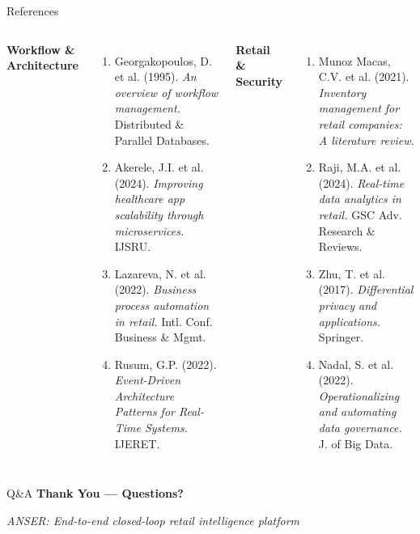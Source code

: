 \documentclass[10pt]{beamer}
\begin{document}
\begin{frame}{References}
\begin{columns}[T]
        \textbf{Workflow \& Architecture}
        \begin{enumerate}
            \item[{[3]}] Georgakopoulos, D. et al. (1995). \textit{An overview of workflow management.} Distributed \& Parallel Databases.
            \item[{[7]}] Akerele, J.I. et al. (2024). \textit{Improving healthcare app scalability through microservices.} IJSRU.
            \item[{[15]}] Lazareva, N. et al. (2022). \textit{Business process automation in retail.} Intl. Conf. Business \& Mgmt.
            \item[{[19]}] Rusum, G.P. (2022). \textit{Event-Driven Architecture Patterns for Real-Time Systems.} IJERET.
        \end{enumerate}
        \vspace{0.15cm}
        \textbf{Retail \& Security}
        \begin{enumerate}
            \item[{[1]}] Munoz Macas, C.V. et al. (2021). \textit{Inventory management for retail companies: A literature review.}
            \item[{[25]}] Raji, M.A. et al. (2024). \textit{Real-time data analytics in retail.} GSC Adv. Research \& Reviews.
            \item[{[31]}] Zhu, T. et al. (2017). \textit{Differential privacy and applications.} Springer.
            \item[{[29]}] Nadal, S. et al. (2022). \textit{Operationalizing and automating data governance.} J. of Big Data.
        \end{enumerate}
    \end{columns}
\end{frame}

\begin{frame}{Q\&A}
    \centering
    \vspace{1cm}
    \Large \textbf{Thank You --- Questions?}
    \vspace{1cm}

    \normalsize
    \textit{ANSER: End-to-end closed-loop retail intelligence platform}
\end{frame}
\end{document}
